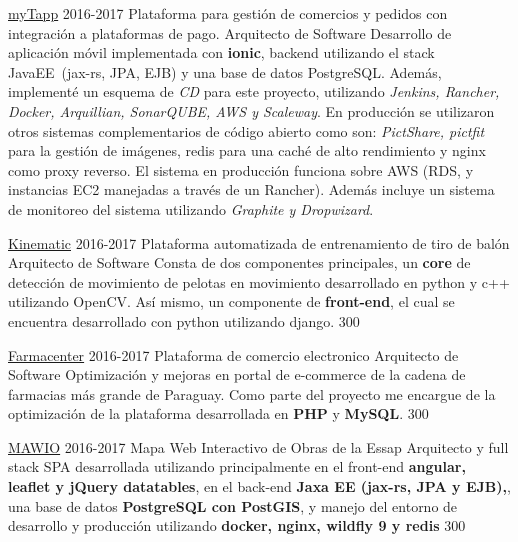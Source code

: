 \documentclass[]{friggeri-cv}
\begin{document}
\begin{entrylist}
{    \proyecto
        {\href{https://www.mytappweb.com}{myTapp}}
        {2016-2017}
        {Plataforma para gestión de comercios y pedidos con integración a plataformas de pago.}
        {Arquitecto de Software}
        {
        Desarrollo de aplicación móvil implementada con  \textbf{ionic}, 
        backend utilizando el stack JavaEE~(jax-rs, JPA, EJB) y una base de datos
        PostgreSQL.  Además, implementé un esquema de \textit{CD} para este proyecto,
        utilizando \textit{Jenkins, Rancher, Docker, Arquillian, SonarQUBE, AWS y Scaleway}.  
        En producción se utilizaron  otros sistemas complementarios de código abierto 
        como son: \textit{PictShare, pictfit} para la gestión de imágenes, redis para una
        caché de alto rendimiento y nginx como proxy reverso.  El sistema en producción 
        funciona sobre AWS (RDS, y instancias EC2 manejadas a 
        través de un Rancher). Además incluye un sistema de monitoreo del sistema
        utilizando \textit{Graphite y Dropwizard}.
        } 
        {}
        
    \proyecto
        {\href{http://www.cds.com.py/productos/kinematics/}{Kinematic}}
        {2016-2017}
        {Plataforma automatizada de entrenamiento de tiro de balón}
        {Arquitecto de Software}
        {Consta de dos componentes principales, un \textbf{core} de detección de movimiento de pelotas en movimiento desarrollado en python y c++ utilizando OpenCV. Así mismo, un componente de \textbf{front-end}, el cual se encuentra desarrollado con python utilizando django.}
        {300}
        
    \proyecto
        {\href{http://www.farmacenter.com.py/}{Farmacenter}}
        {2016-2017}
        {Plataforma de comercio electronico}
        {Arquitecto de Software}
        {
            Optimización y mejoras en portal de e-commerce de la cadena de farmacias más grande de Paraguay. 
            Como parte del proyecto me encargue de la optimización de la plataforma desarrollada en 
            \textbf{PHP} y \textbf{MySQL}.
        }
        {300}
        
    \proyecto
        {\href{https://mawio.net/}{MAWIO}}
        {2016-2017}
        {Mapa Web Interactivo de Obras de la Essap}
        {Arquitecto y full stack}
        {SPA desarrollada utilizando principalmente en el front-end \textbf{angular, leaflet y jQuery datatables}, en el back-end \textbf{Jaxa EE (jax-rs, JPA y EJB),}, una base de datos \textbf{PostgreSQL con PostGIS}, y manejo del entorno de desarrollo y producción utilizando \textbf{docker, nginx, wildfly 9 y redis}}
        {300}
        
}
\end{entrylist}
\end{document}
